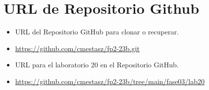 \documentclass{article}
\begin{document}
\section{URL de Repositorio Github}
\begin{itemize}
	\item URL del Repositorio GitHub para clonar o recuperar.
	\item \url{https://github.com/cmestasz/fp2-23b.git}
	\item URL para el laboratorio 20 en el Repositorio GitHub.
	\item \url{https://github.com/cmestasz/fp2-23b/tree/main/fase03/lab20}
\end{itemize}
\pagebreak
\end{document}
